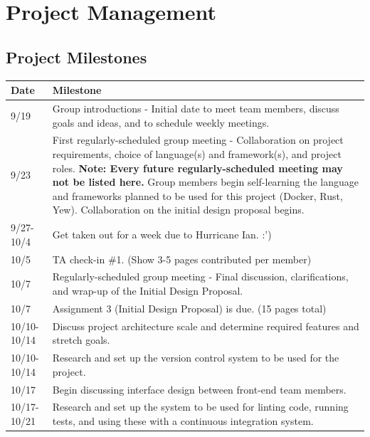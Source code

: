 \documentclass[
    paper=letter,
    parskip=half,
    fontsize=12pt,
    titlepage=firstiscover,
    toc=bibliography,
    numbers=endperiod
]{scrartcl}
\let\oldsection\section
\renewcommand{\section}{\newpage\oldsection}
\begin{document}
\section{Project Management}

\subsection{Project Milestones}

{\renewcommand{\arraystretch}{1.4}
    \begin{tabularx}{\textwidth}{|l|X|}
        \hline
        \textbf{Date} & \textbf{Milestone} \\\hline
        9/19          & Group introductions - Initial date to meet team members, discuss goals and ideas, and to schedule weekly meetings. \\\hline
        9/23          & First regularly-scheduled group meeting - Collaboration on project requirements, choice of language(s) and framework(s), and project roles. \newline \textbf{Note: Every future regularly-scheduled meeting may not be listed here.} \newline \newline Group members begin self-learning the language and frameworks planned to be used for this project (Docker, Rust, Yew). Collaboration on the initial design proposal begins.\\\hline
        9/27-10/4     & Get taken out for a week due to Hurricane Ian. :') \\\hline
        10/5          & TA check-in \#1. (Show 3-5 pages contributed per member) \\\hline
        10/7          & Regularly-scheduled group meeting - Final discussion, clarifications, and wrap-up of the Initial Design Proposal. \\\hline
        10/7          & Assignment 3 (Initial Design Proposal) is due. (15 pages total) \\\hline
        10/10-10/14   & Discuss project architecture scale and determine required features and stretch goals. \\\hline
        10/10-10/14   & Research and set up the version control system to be used for the project. \\\hline
        10/17         & Begin discussing interface design between front-end team members. \\\hline
        10/17-10/21   & Research and set up the system to be used for linting code, running tests, and using these with a continuous integration system. \\\hline

\end{tabularx}}
\end{document}
